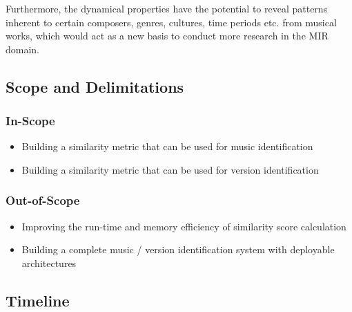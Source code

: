 \documentclass[../main.tex]{subfiles}
\begin{document}
\par
Furthermore, the dynamical properties have the potential to reveal patterns inherent to certain composers, genres, cultures, time periods etc. from musical works, which would act as a new basis to conduct more research in the \gls{MIR} domain.
\fi


\subsection{Scope and Delimitations}

\subsubsection{In-Scope}
\begin{itemize}
    \item Building a similarity metric that can be used for music identification
    \item Building a similarity metric that can be used for version identification
\end{itemize}

\subsubsection{Out-of-Scope}
\begin{itemize}
    \item Improving the run-time and memory efficiency of similarity score calculation
    \item Building a complete music / version identification system with deployable architectures
\end{itemize}


\subsection{Timeline}
\begin{table}[h]
    \centering
    \caption{Expected Timeline}
    \label{tab:my_label}
\end{table}
\end{document}
